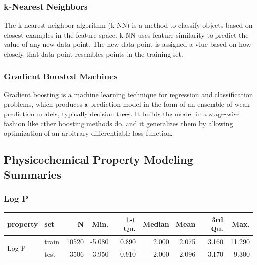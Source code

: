 \documentclass[10pt, letter]{article}
\renewcommand{\=}{\, =\, }
\newcommand{\+}{\, +\, }
\renewcommand{\-}{\, -\, }
\begin{document}
\subsubsection{k-Nearest Neighbors}
The k-nearest neighbor algorithm (k-NN) is a method to classify objects based on closest examples in the feature space.
k-NN uses feature similarity to predict the value of any new data point. The new data point is assigned a vlue based on how closely that data point resembles points in the training set.

\subsubsection{Gradient Boosted Machines}
Gradient boosting is a machine learning technique for regression and classification problems, which produces a prediction model in the form of an ensemble of weak prediction models, typically decision trees. It builds the model in a stage-wise fashion like other boosting methods do, and it generalizes them by allowing optimization of an arbitrary differentiable loss function.

\newpage

\subsection{Physicochemical Property Modeling Summaries}

\subsubsection{Log P}

\begin{table}[H]
\begin{center}
\begin{tabular}{llrrrrrrr}
\toprule
{\bf property} & {\bf set} & {\bf N} & {\bf Min.} & {\bf 1st Qu.} &  {\bf Median}  & {\bf Mean}  & {\bf 3rd Qu.} & {\bf Max.}\\
\midrule
\multirow{2}{15mm}{Log P}
& train &  10520 & -5.080 & 0.890 & 2.000 & 2.075 & 3.160 & 11.290\\
& test &  3506 & -3.950 & 0.910 & 2.000 & 2.096 & 3.170 & 9.300\\
\midrule
\hline
\end{tabular}
\end{center}
\end{table}
\end{document}
